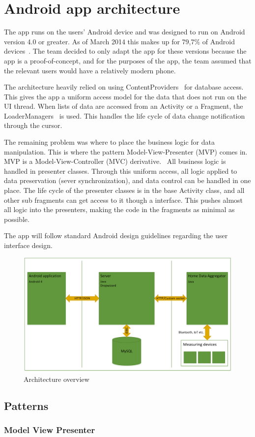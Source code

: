 

\section{Android app architecture}
The app runs on the users' Android device and was designed to run on Android version 4.0 or greater. As of March 2014 this makes up for 79,7\% of Android devices~\cite{AndroidDeviceFragmentation}. The team decided to only adapt the app for these versions because the app is a proof-of-concept, and for the purposes of the app, the team assumed that the relevant users would have a relatively modern phone. 

The architecture heavily relied on using ContentProviders~\cite{contentproviders} for database access. This gives the app a uniform access model for the data that does not run on the UI thread. When lists of data are accessed from an Activity or a Fragment, the LoaderManagers~\cite{loadermanager} is used. This handles the life cycle of data change notification through the cursor. 

The remaining problem was where to place the business logic for data manipulation. This is where the pattern Model-View-Presenter (MVP) comes in. MVP is a Model-View-Controller (MVC) derivative.~\cite{mvc} All business logic is handled in presenter classes. Through this uniform access, all logic applied to data preservation (sever synchronization), and data control can be handled in one place. The life cycle of the presenter classes is in the base Activity class, and all other sub fragments can get access to it though a interface. This pushes almost all logic into the presenters, making the code in the fragments as minimal as possible.

The app will follow standard Android design guidelines regarding the user interface design.


\begin{figure}[H]
\includegraphics[width=\textwidth]{ch/architecture/fig/architecture.png}
\caption{Architecture overview}
\end{figure}

\subsection{Patterns}
\subsubsection{Model View Presenter}

